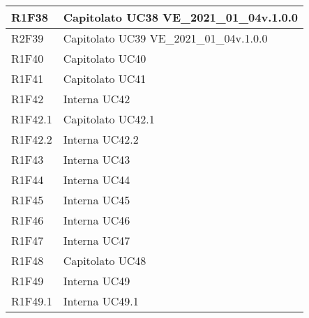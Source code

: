 \begin{center}
\begin{longtable}{|p{22mm}|p{44mm}|}
R1F38 &
Capitolato \newline
UC38 \newline
VE\_2021\_01\_04v.1.0.0 
\\
\hline

R2F39 &
Capitolato \newline
UC39 \newline
VE\_2021\_01\_04v.1.0.0 
\\
\hline

 
R1F40 &
Capitolato \newline
UC40 
\\
\hline

R1F41 &
Capitolato \newline
UC41 
\\
\hline

R1F42 &
Interna \newline
UC42 
\\
\hline

R1F42.1 &
Capitolato \newline
UC42.1 
\\
\hline

R1F42.2 &
Interna \newline
UC42.2 
\\
\hline

R1F43 &
Interna \newline
UC43 
\\
\hline

R1F44 &
Interna \newline
UC44 
\\
\hline

R1F45 &
Interna \newline
UC45 
\\
\hline

R1F46 &
Interna \newline
UC46 
\\
\hline

R1F47 &
Interna \newline
UC47 
\\
\hline

R1F48 &
Capitolato \newline
UC48 
\\
\hline

R1F49 &
Interna \newline
UC49 
\\
\hline

R1F49.1 &
Interna \newline
UC49.1 
\\
\hline


\end{longtable}
\end{center}
